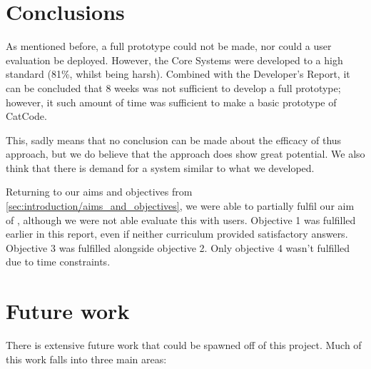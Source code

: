 %


\section{Conclusions}\label{sec:conclusions}
As mentioned before, a full prototype could not be made, nor could a user evaluation be deployed. However, the Core Systems were developed to a high standard (81\%, whilst being harsh). Combined with the Developer's Report, it can be concluded that 8 weeks was not sufficient to develop a full prototype; however, it such amount of time was sufficient to make a basic prototype of CatCode.

This, sadly means that no conclusion can be made about the efficacy of thus approach, but we do believe that the approach does show great potential. We also think that there is demand for a system similar to what we developed.

Returning to our aims and objectives from \autoref{sec:introduction/aims_and_objectives}, we were able to partially fulfil our aim of , although we were not able evaluate this with users. Objective 1 was fulfilled earlier in this report, even if neither curriculum provided satisfactory answers. Objective 3 was fulfilled alongside objective 2. Only objective 4 wasn't fulfilled due to time constraints.

\section{Future work}\label{sec:future}
There is extensive future work that could be spawned off of this project. Much of this work falls into three main areas:

